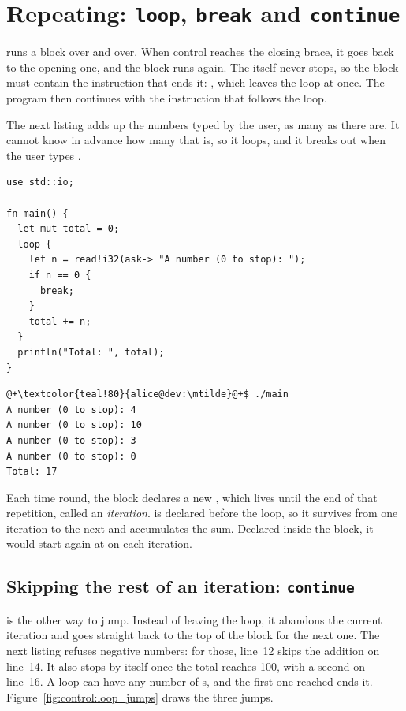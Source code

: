 \vfill\pagebreak
\section{Repeating: \texttt{loop}, \texttt{break} and \texttt{continue}}
\label{sec:control:loop}

 runs a block over and over. When control reaches the closing brace,
it goes back to the opening one, and the block runs again. The 
itself never stops, so the block must contain the instruction that ends it:
, which leaves the loop at once. The program then continues with
the instruction that follows the loop.

The next listing adds up the numbers typed by the user, as many as there are. It
cannot know in advance how many that is, so it loops, and it breaks out when the
user types .

\begin{lstlisting}[style=coloredverbatim, caption=Repeating until the user says stop, label=lst:control:loop]
use std::io;

fn main() {
  let mut total = 0;
  loop {
    let n = read!i32(ask-> "A number (0 to stop): ");
    if n == 0 {
      break;
    }
    total += n;
  }
  println("Total: ", total);
}
\end{lstlisting}
\vspace{-10pt}%
\begin{lstlisting}[style=bashVerb, escapechar=@+]
@+\textcolor{teal!80}{alice@dev:\mtilde}@+$ ./main
A number (0 to stop): 4
A number (0 to stop): 10
A number (0 to stop): 3
A number (0 to stop): 0
Total: 17
\end{lstlisting}

Each time round, the block declares a new , which lives until the end of
that repetition, called an \textit{iteration}.  is declared before
the loop, so it survives from one iteration to the next and accumulates the sum.
Declared inside the block, it would start again at  on each iteration.


\subsection{Skipping the rest of an iteration: \texttt{continue}}

 is the other way to jump. Instead of leaving the loop, it
abandons the current iteration and goes straight back to the top of the block
for the next one. The next listing refuses negative numbers: for those, line~12
skips the addition on line~14. It also stops by itself once the total reaches
100, with a second  on line~16. A loop can have any number of
s, and the first one reached ends it.
Figure~\ref{fig:control:loop_jumps} draws the three jumps.

